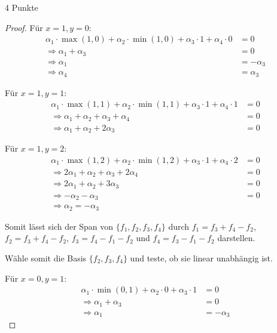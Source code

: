 \documentclass{problemset}
\begin{document}
\begin{problem}{4 Punkte}
\begin{proof}
	Für $x = 1, y = 0$:
	\begin{align*}
		\alpha_1 \cdot \max(1, 0) + \alpha_2 \cdot \min(1, 0) + \alpha_3 \cdot 1 + \alpha_4 \cdot 0 & = 0         \\
		\Rightarrow \alpha_1 + \alpha_3                                                             & = 0         \\
		\Rightarrow \alpha_1                                                                        & = -\alpha_3 \\
		\Rightarrow \alpha_4                                                                        & = \alpha_3
	\end{align*}

	Für $x = 1, y = 1$:
	\begin{align*}
		\alpha_1 \cdot \max(1, 1) + \alpha_2 \cdot \min(1, 1) + \alpha_3 \cdot 1 + \alpha_4 \cdot 1 & = 0 \\
		\Rightarrow \alpha_1 + \alpha_2 + \alpha_3 + \alpha_4                                       & = 0 \\
		\Rightarrow \alpha_1 + \alpha_2 + 2 \alpha_3                                                & = 0
	\end{align*}

	Für $x = 1, y = 2$:
	\begin{align*}
		\alpha_1 \cdot \max(1, 2) + \alpha_2 \cdot \min(1, 2) + \alpha_3 \cdot 1 + \alpha_4 \cdot 2 & = 0 \\
		\Rightarrow 2\alpha_1 + \alpha_2 + \alpha_3 + 2\alpha_4                                     & = 0 \\
		\Rightarrow 2\alpha_1 + \alpha_2 + 3 \alpha_3                                               & = 0 \\
		\Rightarrow -\alpha_2 - \alpha_3                                                            & = 0 \\
		\Rightarrow \alpha_2 = - \alpha_3
	\end{align*}

	Somit lässt sich der Span von $\{f_1, f_2, f_3, f_4\}$ durch $f_1 = f_3 + f_4 - f_2$, $f_2 = f_3 + f_4 - f_2$, $f_3 = f_4 - f_1 - f_2$ und $f_4 = f_3 - f_1 - f_2$ darstellen.

	Wähle somit die Basis $\{f_2, f_3, f_4\}$ und teste, ob sie linear unabhängig ist.

	Für $x = 0, y = 1$:
	\begin{align*}
		\alpha_1 \cdot \min(0, 1) + \alpha_2 \cdot 0 + \alpha_3 \cdot 1 & = 0         \\
		\Rightarrow \alpha_1 + \alpha_3                                 & = 0         \\
		\Rightarrow \alpha_1                                            & = -\alpha_3
	\end{align*}


\end{proof}
\end{problem}
\end{document}

